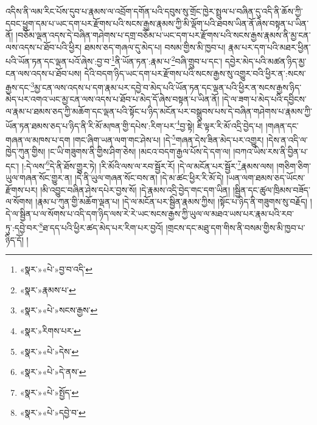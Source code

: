 འདིས་ནི་ལམ་རིང་པོས་དུབ་པ་རྣམས་ལ་འབྲོག་དགོན་པའི་དབུས་སུ་གྲོང་ཁྱེར་སྤྲུལ་པ་བཞིན་དུ་འདི་ནི་ཆོས་ཀྱི་དབང་ཕྱུག་དམ་པ་ཡང་དག་པར་རྫོགས་པའི་སངས་རྒྱས་རྣམས་ཀྱི་མི་ལྡོག་པའི་ཐབས་ཡིན་ནོ་ཞེས་བསྟན་པ་ཡིན་ནོ། །བཅོམ་ལྡན་འདས་དེ་བཞིན་གཤེགས་པ་དགྲ་བཅོམ་པ་ཡང་དག་པར་རྫོགས་པའི་སངས་རྒྱས་རྣམས་ནི་མྱ་ངན་ལས་འདས་པ་ཐོབ་པའི་ཕྱིར། ཐམས་ཅད་གཞལ་དུ་མེད་པ། བསམ་གྱིས་མི་ཁྱབ་པ། རྣམ་པར་དག་པའི་མཐར་ཕྱིན་པའི་ཡོན་ཏན་དང་ལྡན་པའོ་ཞེས་:བྱ་བ་\footnote{«སྣར་»«པེ་»བྱ་བ་འདི་}ནི་ཡོན་ཏན་:རྣམ་པ་\footnote{«སྣར་»རྣམས་པ་}བཞི་གྲུབ་པ་དང་། དབྱེར་མེད་པའི་མཚན་ཉིད་མྱ་ངན་ལས་འདས་པ་ཐོབ་པས། དེའི་བདག་ཉིད་ཡང་དག་པར་རྫོགས་པའི་སངས་རྒྱས་སུ་འགྱུར་བའི་ཕྱིར་ན་:སངས་རྒྱས་དང་\footnote{«སྣར་»«པེ་»སངས་རྒྱས་}མྱ་ངན་ལས་འདས་པ་དག་རྣམ་པར་དབྱེ་བ་མེད་པའི་ཡོན་ཏན་དང་ལྡན་པའི་ཕྱིར་ན་སངས་རྒྱས་ཉིད་མེད་པར་འགའ་ཡང་མྱ་ངན་ལས་འདས་པ་ཐོབ་པ་མེད་དོ་ཞེས་བསྟན་པ་ཡིན་ནོ། །དེ་ལ་ཟག་པ་མེད་པའི་དབྱིངས་ལ་རྣམ་པ་ཐམས་ཅད་ཀྱི་མཆོག་དང་ལྡན་པའི་སྟོང་པ་ཉིད་མངོན་པར་བསྒྲུབས་པས་དེ་བཞིན་གཤེགས་པ་རྣམས་ཀྱི་ཡོན་ཏན་ཐམས་ཅད་པ་ཉིད་ནི་རི་མོ་མཁན་གྱི་དཔེས་:རིག་པར་\footnote{«སྣར་»རིགས་པར་}བྱ་སྟེ། ཇི་ལྟར་རི་མོ་འདྲི་བྱེད་པ། །གཞན་དང་གཞན་ལ་མཁས་པ་དག །གང་ཞིག་ཡན་ལག་གང་ཤེས་པ། །དེ་\footnote{«སྣར་»«པེ་»དེས་}གཞན་དེས་ཟིན་མེད་པར་འགྱུར། །དེས་ན་འདི་ལ་ཁྱེད་ཀུན་གྱིས། །ང་ཡི་གཟུགས་ནི་གྱིས་ཤིག་ཅེས། །མངའ་བདག་རྒྱལ་པོས་དེ་དག་ལ། །བཀའ་ཡིས་རས་ནི་བྱིན་པ་དང་། །:དེ་ལས་\footnote{«སྣར་»«པེ་»དེ་ནས་}དེ་ནི་ཐོས་གྱུར་ཏེ། །རི་མོའི་ལས་ལ་རབ་སྦྱོར་རོ། །དེ་ལ་མངོན་པར་སྦྱོར་\footnote{«སྣར་»«པེ་»སྤྱོད་}རྣམས་ལས། །གཅིག་ཅིག་ཡུལ་གཞན་སོང་གྱུར་ན། །དེ་ནི་ཡུལ་གཞན་སོང་བས་ན། །དེ་མ་ཚང་ཕྱིར་རི་མོ་དེ། །ཡན་ལག་ཐམས་ཅད་ཡོངས་རྫོགས་པར། །མི་འབྱུང་བཞིན་ཤེས་དཔེར་བྱས་སོ། །དེ་རྣམས་འདྲི་བྱེད་གང་དག་ཡིན། །སྦྱིན་དང་ཚུལ་ཁྲིམས་བཟོད་ལ་སོགས། །རྣམ་པ་ཀུན་གྱི་མཆོག་ལྡན་པ། །དེ་ལ་མངོན་པར་སྦྱིན་རྣམས་ཀྱིས། །སྟོང་པ་ཉིད་ནི་གཟུགས་སུ་བརྗོད། །དེ་ལ་སྦྱིན་པ་ལ་སོགས་པ་འདི་དག་ཉིད་ལས་རེ་རེ་ཡང་སངས་རྒྱས་ཀྱི་ཡུལ་ལ་མཐའ་ཡས་པར་རྣམ་པའི་རབ་ཏུ་:དབྱེ་བར་\footnote{«སྣར་»«པེ་»དབྱེ་བ་}ཐ་དད་པའི་ཕྱིར་ཚད་མེད་པར་རིག་པར་བྱའོ། །གྲངས་དང་མཐུ་དག་གིས་ནི་བསམ་གྱིས་མི་ཁྱབ་པ་ཉིད་དོ། །
